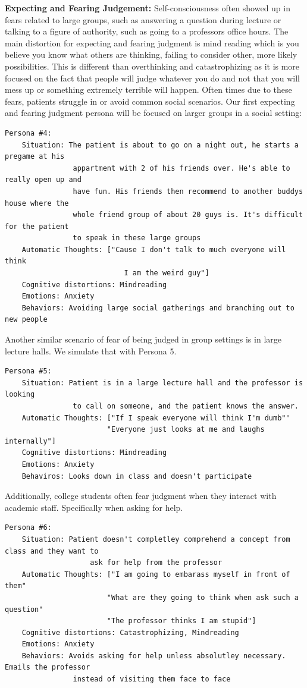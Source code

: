 \documentclass[twoside]{report}
\begin{document}
\textbf{Expecting and Fearing Judgement:} Self-consciousness often showed up in fears related to large groups, such as answering a question during lecture or talking to a figure of authority, such as going to a professors office hours. The main distortion for expecting and fearing judgment is mind reading which is you believe you know what others are thinking, failing to consider other, more likely possibilities. This is different than overthinking and catastrophizing as it is more focused on the fact that people will judge whatever you do and not that you will mess up or something extremely terrible will happen. Often times due to these fears, patients struggle in or avoid common social scenarios. Our first expecting and fearing judgment persona will be focused on larger groups in a social setting:
\begin{verbatim}
Persona #4:
    Situation: The patient is about to go on a night out, he starts a pregame at his 
                appartment with 2 of his friends over. He's able to really open up and 
                have fun. His friends then recommend to another buddys house where the
                whole friend group of about 20 guys is. It's difficult for the patient 
                to speak in these large groups
    Automatic Thoughts: ["Cause I don't talk to much everyone will think 
                            I am the weird guy"]
    Cognitive distortions: Mindreading
    Emotions: Anxiety
    Behaviors: Avoiding large social gatherings and branching out to new people
\end{verbatim}
Another similar scenario of fear of being judged in group settings is in large lecture halls. We simulate that with Persona 5.
\begin{verbatim}
Persona #5:
    Situation: Patient is in a large lecture hall and the professor is looking 
                to call on someone, and the patient knows the answer.
    Automatic Thoughts: ["If I speak everyone will think I'm dumb"'
                        "Everyone just looks at me and laughs internally"]
    Cognitive distortions: Mindreading
    Emotions: Anxiety
    Behaviros: Looks down in class and doesn't participate
\end{verbatim}
Additionally, college students often fear judgment when they interact with academic staff. Specifically when asking for help. 
\begin{verbatim}
Persona #6:
    Situation: Patient doesn't completley comprehend a concept from class and they want to 
                    ask for help from the professor
    Automatic Thoughts: ["I am going to embarass myself in front of them"
                        "What are they going to think when ask such a question"
                        "The professor thinks I am stupid"]
    Cognitive distortions: Catastrophizing, Mindreading
    Emotions: Anxiety
    Behaviors: Avoids asking for help unless absolutley necessary. Emails the professor
                instead of visiting them face to face
\end{verbatim}
\end{document}
